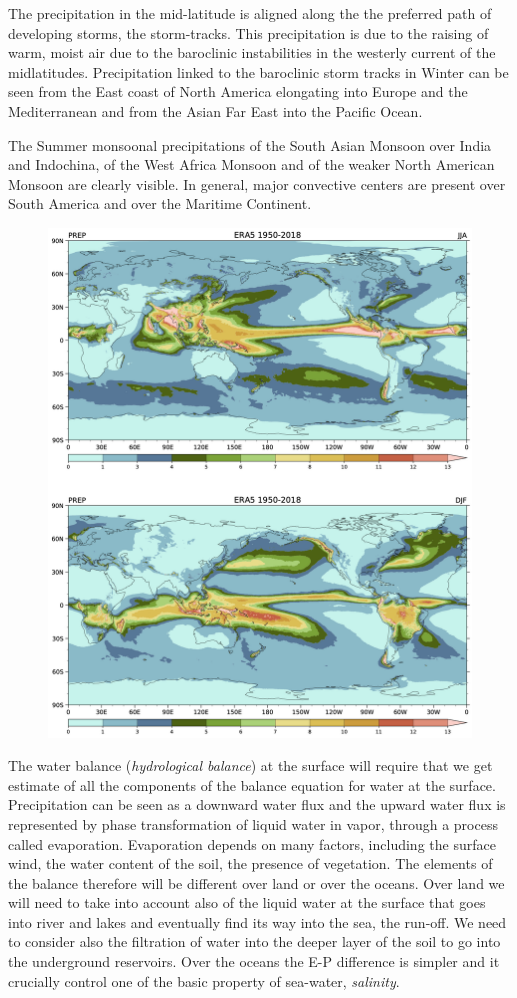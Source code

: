 The precipitation in the mid-latitude is aligned along the the preferred
path of developing storms, the storm-tracks. This precipitation is due
to the raising of warm, moist air due to the baroclinic instabilities in
the westerly current of the midlatitudes. Precipitation linked to the
baroclinic storm tracks in Winter can be seen from the East coast of
North America elongating into Europe and the Mediterranean and from the
Asian Far East into the Pacific Ocean.

The Summer monsoonal precipitations of the South Asian Monsoon over
India and Indochina, of the West Africa Monsoon and of the weaker North
American Monsoon are clearly visible. In general, major convective
centers are present over South America and over the Maritime Continent.

\begin{figure}
\centering
\includegraphics[width = .7 \textwidth]{figs/GD/TPREP.png}
\caption{} \label{fig:}
\end{figure}

The water balance (\emph{hydrological balance}) at the surface will
require that we get estimate of all the components of the balance
equation for water at the surface. Precipitation can be seen as a
downward water flux and the upward water flux is represented by phase
transformation of liquid water in vapor, through a process called
evaporation. Evaporation depends on many factors, including the surface
wind, the water content of the soil, the presence of vegetation. The
elements of the balance therefore will be different over land or over
the oceans. Over land we will need to take into account also of the
liquid water at the surface that goes into river and lakes and
eventually find its way into the sea, the run-off. We need to consider
also the filtration of water into the deeper layer of the soil to go
into the underground reservoirs. Over the oceans the E-P difference is
simpler and it crucially control one of the basic property of sea-water,
\emph{salinity}.

